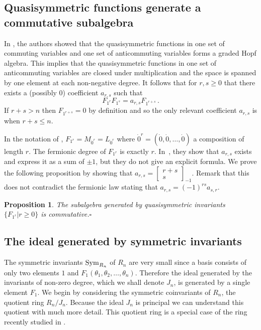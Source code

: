 \documentclass[submission]{FPSAC2023}
\newtheorem{prop}[theorem]{Proposition}
\theoremstyle{definition}
\numberwithin{equation}{section}
\newcommand{\qbinom}[2]{\left[ \begin{smallmatrix}#1\\#2\end{smallmatrix} \right]}
\begin{document}
\subsection{Quasisymmetric functions generate a commutative subalgebra}
In \cite{FLP}, the authors showed that the quasisymmetric functions in
one set of commuting variables and one set of anticommuting variables
forms a graded Hopf algebra.  This implies that the quasisymmetric functions
in one set of anticommuting variables are closed under multiplication
and the space is spanned by one element at each non-negative degree.
It follows that for $r, s \geq0$ that there exists a (possibly $0$)
coefficient $a_{r,s}$ such that
\begin{equation}\label{eq:qsalg}
F_{1^r} F_{1^s} = a_{r,s} F_{1^{r+s}}\,.
\end{equation}
If $r+s>n$ then $F_{1^{r+s}} = 0$ by definition and so the only relevant coefficient $a_{r,s}$ is when
$r+s \leq n$.

In the notation of \cite{FLP}, $F_{1^r}=M_{\dot{0}^r}=L_{\dot{0}^r}$ where $\dot{0}^r=(\dot{0},\dot{0},\ldots,\dot{0})$ a composition of length $r$. The fermionic degree of $F_{1^r}$ is exactly $r$. In~\cite{FLP}, they show that $a_{r,s}$ exists and express it as a sum of $\pm 1$, but they do not give an explicit formula. We prove the following proposition by showing that $a_{r,s} = \qbinom{r+s}{s}_{-1}$. Remark that this does not contradict the fermionic law stating that $a_{r,s} = (-1)^{rs} a_{s,r}$.

\begin{prop}
The subalgebra generated by quasisymmetric invariants $\{F_{1^r}|r\ge 0\}$ is commutative.\hfill$\square$
\end{prop}

\subsection{The ideal generated by symmetric invariants}
The symmetric invariants ${\rm Sym}_{R_n}$ of $R_n$ are very small since a basis consists of only two
elements $1$ and $F_1(\theta_1, \theta_2, \ldots, \theta_n)$.  Therefore the ideal generated by the invariants of non-zero
degree, which we shall denote $J_n$, is generated by a single element
$F_1$.
We begin by considering the symmetric
coinvariants of $R_n$, the quotient ring $R_n/J_n$.
Because the ideal $J_n$ is principal we can
understand this quotient with much more detail.
This quotient ring is a special case of the ring
recently studied in \cite{IRR,KR}.
\end{document}

